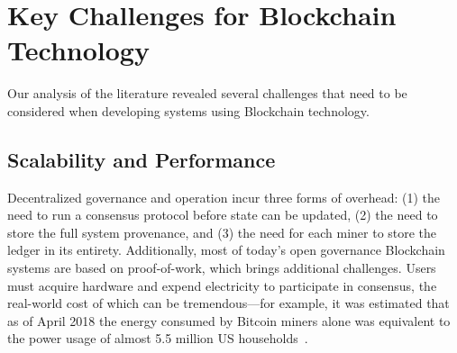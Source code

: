 \section{Key Challenges for Blockchain Technology}
\label{sec:challenges}

Our analysis of the literature revealed several challenges that need to be considered when developing systems using Blockchain technology.

\subsection{Scalability and Performance}
Decentralized governance and operation incur three forms of overhead: (1) the 
need to run a consensus protocol before state can be updated, (2) the need to 
store the full system provenance, and (3) the need for each miner to store the 
ledger in its entirety. %
Additionally, most of today's open governance Blockchain systems are based on 
proof-of-work, which brings additional challenges.
Users must acquire hardware and expend electricity to participate in consensus, 
the real-world cost of which can be tremendous---for example, it was estimated 
that as of April 2018 the energy consumed by Bitcoin miners alone was 
equivalent to the power usage of almost 5.5 million US 
households~\cite{Digiconomist}.


